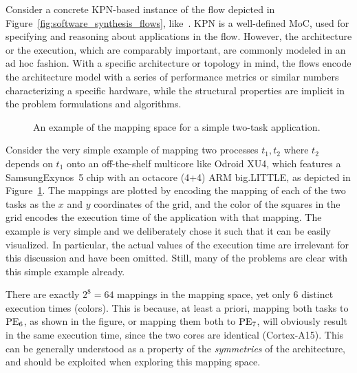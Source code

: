 Consider a concrete \ac{KPN}-based instance of the flow depicted in Figure~\ref{fig:software_synthesis_flows}, like~\cite{maps,pimentel2006systematic,thiele2007DOL}.
\ac{KPN} is a well-defined \ac{MoC}, used for specifying and reasoning about applications in the flow.
However, the architecture or the execution, which are comparably important, are commonly modeled in an ad hoc fashion.
With a specific architecture or topology in mind, the flows encode the architecture model with a series of performance metrics or similar numbers characterizing a specific hardware, while the structural properties are implicit in the problem formulations and algorithms.

\begin{figure}[h]
	\centering
\resizebox{0.95\textwidth}{!}{
   \begin{tikzpicture}
     
   \end{tikzpicture}
 }
   \caption{An example of the mapping space for a simple two-task application.}
   \label{fig:mapping_space_motivation}
\end{figure}


Consider the very simple example of mapping two processes $t_1,t_2$ where $t_2$ depends on $t_1$ onto an off-the-shelf multicore like Odroid XU4, which features a Samsung\texttrademark Exynos~5 chip with an octacore (4+4) ARM big.LITTLE\texttrademark, as depicted in Figure~\ref{fig:mapping_space_motivation}.
The mappings are plotted by encoding the mapping of each of the two tasks as the $x$ and $y$ coordinates of the grid, and the color of the squares in the grid encodes the execution time of the application with that mapping.
The example is very simple and we deliberately chose it such that it can be easily visualized.
In particular, the actual values of the execution time are irrelevant for this discussion and have been omitted.
Still, many of the problems are clear with this simple example already.

There are exactly $2^8 = 64$ mappings in the mapping space, yet only 6 distinct execution times (colors).
This is because, at least a priori, mapping both tasks to $\operatorname{PE}_6$, as shown in the figure, or mapping them both to $\operatorname{PE}_7$, will obviously result in the same execution time, since the two cores are identical (Cortex-A15\texttrademark).
This can be generally understood as a property of the \emph{symmetries} of the architecture, and should be exploited when exploring this mapping space.

